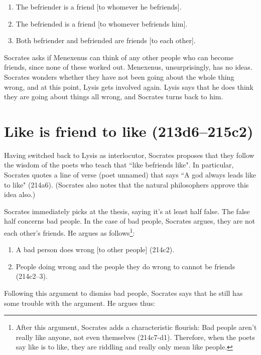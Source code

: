 \documentclass[11pt]{article}
\begin{document}
\begin{enumerate}
    \item The befriender is a friend [to whomever he befriends].
    \item The befriended is a friend [to whomever befriends him].
    \item Both befriender and befriended are friends [to each other].
\end{enumerate}

Socrates asks if Menexenus can think of any other people who can become friends, since none of these worked out.  Menexenus, unsurprisingly, has no ideas.  Socrates wonders whether they have not been going about the whole thing wrong, and at this point, Lysis gets involved again.  Lysis says that he does think they are going about things all wrong, and Socrates turns back to him.


\section{Like is friend to like (213d6--215c2)}

Having switched back to Lysis as interlocutor, Socrates proposes that they follow the wisdom of the poets who teach that ``like befriends like".  In particular, Socrates quotes a line of verse (poet unnamed) that says ``A god always leads like to like" (214a6).  (Socrates also notes that the natural philosophers approve this idea also.)

Socrates immediately picks at the thesis, saying it's at least half false.  The false half concerns bad people.  In the case of bad people, Socrates argues, they are not each other's friends.  He argues as follows\footnote{After this argument, Socrates adds a characteristic flourish: Bad people aren't really like anyone, not even themselves (214c7-d1).  Therefore, when the poets say like is to like, they are riddling and really only mean  like people.}:

\begin{enumerate}
    \item A bad person does wrong [to other people] (214c2).
    \item People doing wrong and the people they do wrong to cannot be friends (214c2--3).
\end{enumerate}

Following this argument to dismiss bad people, Socrates says that he still has some trouble with the argument.  He argues thus:
\end{document}
